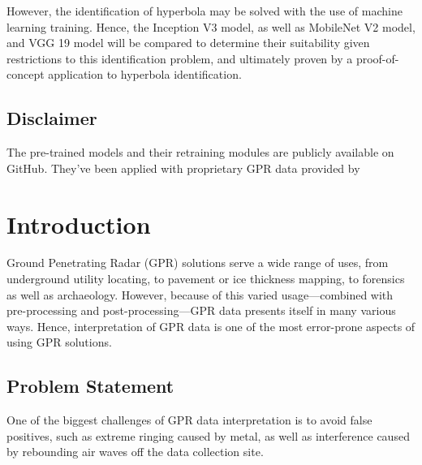 \documentclass[se,blockletter]{uw-wkrpt}
\begin{document}
However, the identification of hyperbola may be solved with the use of machine learning training. Hence, the Inception V3 model, as well as MobileNet V2 model, and VGG 19 model will be compared to determine their suitability given restrictions to this identification problem, and ultimately proven by a proof-of-concept application to hyperbola identification.

\subsection{Disclaimer}
The pre-trained models and their retraining modules are publicly available on GitHub. They've been applied with proprietary GPR data provided by \thecompany{}  

\tableofcontents
\listoffigures
\listoftables

\mainmatter

\section{Introduction}\label{sec:intro}
Ground Penetrating Radar (GPR) solutions serve a wide range of uses, from underground utility locating, to pavement or ice thickness mapping, to forensics as well as archaeology. However, because of this varied usage---combined with pre-processing and post-processing---GPR data presents itself in many various ways. Hence, interpretation of GPR data is one of the most error-prone aspects of using GPR solutions.

\subsection{Problem Statement}
One of the biggest challenges of GPR data interpretation is to avoid false positives, such as extreme ringing caused by metal, 
as well as interference caused by rebounding air waves off the data collection site.
\end{document}
